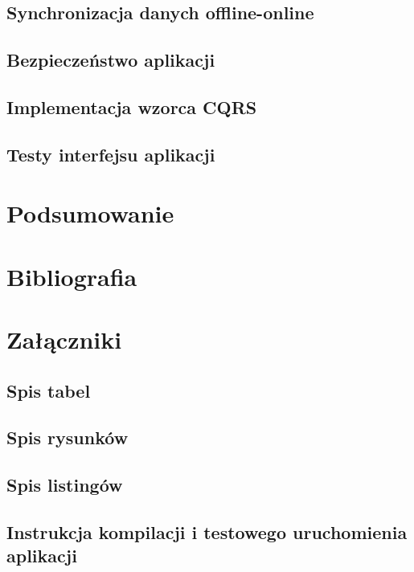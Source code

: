 \section{Synchronizacja danych offline-online}
\section{Bezpieczeństwo aplikacji}
\section{Implementacja wzorca CQRS}
\section{Testy interfejsu aplikacji}
\chapter{Podsumowanie}
\chapter*{Bibliografia}
\chapter*{Załączniki}
\section*{Spis tabel}
\section*{Spis rysunków}
\section*{Spis listingów}
\section*{Instrukcja kompilacji i testowego uruchomienia aplikacji}
